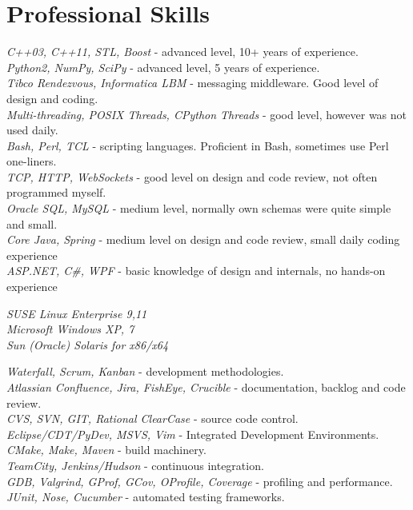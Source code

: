 \documentclass[10pt]{article} %
\begin{document}

\section{Professional Skills}

{
\textit{C++03, C++11, STL, Boost} - advanced level, 10+ years of experience.\\
\textit{Python2, NumPy, SciPy} - advanced level, 5 years of experience.\\
\textit{Tibco Rendezvous, Informatica LBM} - messaging middleware. Good level of design and coding.\\
\textit{Multi-threading, POSIX Threads, CPython Threads} - good level, however was not used daily.\\
\textit{Bash, Perl, TCL} - scripting languages. Proficient in Bash, sometimes use Perl one-liners.\\
\textit{TCP, HTTP, WebSockets} - good level on design and code review, not often programmed myself.\\
\textit{Oracle SQL, MySQL} - medium level, normally own schemas were quite simple and small.\\
\textit{Core Java, Spring} - medium level on design and code review, small daily coding experience\\
\textit{ASP.NET, C\#, WPF} - basic knowledge of design and internals, no hands-on experience\\
}


{
\textit{SUSE Linux Enterprise 9,11}\\
\textit{Microsoft Windows XP, 7}\\
\textit{Sun (Oracle) Solaris for x86/x64}
}


{
\textit{Waterfall, Scrum, Kanban} - development methodologies.\\
\textit{Atlassian Confluence, Jira, FishEye, Crucible} - documentation, backlog and code review.\\
\textit{CVS, SVN, GIT, Rational ClearCase} - source code control.\\
\textit{Eclipse/CDT/PyDev, MSVS, Vim} - Integrated Development Environments.\\
\textit{CMake, Make, Maven} - build machinery.\\
\textit{TeamCity, Jenkins/Hudson} - continuous integration.\\
\textit{GDB, Valgrind, GProf, GCov, OProfile, Coverage} - profiling and performance.\\ 
\textit{JUnit, Nose, Cucumber} - automated testing frameworks.\\
}
\end{document}
